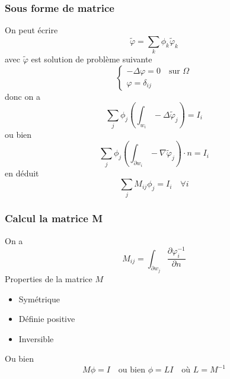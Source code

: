 \begin{frame}
\frametitle{Sous forme de matrice}
On peut \'ecrire
 \begin{equation}
 \tilde\varphi = \sum_k \phi_k \tilde{\varphi}_k
 \end{equation}
 avec $\tilde{\varphi}$ est solution de probl\`eme suivante 
 \begin{equation}
 \begin{cases}
 -\Delta{\varphi} = 0 \quad \text{sur } \Omega \\
 {\varphi} = \delta_{ij} 
 \end{cases}
 \end{equation}
 donc on a
 \begin{equation}
 \sum_j \phi_j \left( \int_{w_i}-\Delta\tilde{\varphi}_j \right) =I_i
 \end{equation}
 ou bien
 \begin{equation}
  \sum_j \phi_j \left( \int_{\partial w_i}-\nabla\tilde{\varphi}_j \right) \cdot n =I_i
 \end{equation}
 en d\'eduit
  \begin{equation}
  \sum_j M_{ij}\phi_j =I_i \quad \forall i 
 \end{equation}
%


\end{frame} 

 \begin{frame}
\frametitle{Calcul la matrice M}
On a
\begin{equation}
  M_{ij} = \int_{\partial w_j} \frac{\partial\varphi_i^{-1}}{\partial n}
\end{equation}
 Properties de la matrice $M$
 \begin{itemize}
 \item Sym\'etrique 
 \item D\'efinie positive
 \item Inversible
 \end{itemize}
 Ou bien
\begin{equation}
  M\phi =I \quad \text{ou bien } \phi =LI \quad \text{o\`u } L=M^{-1} 
\end{equation}


\end{frame} 

